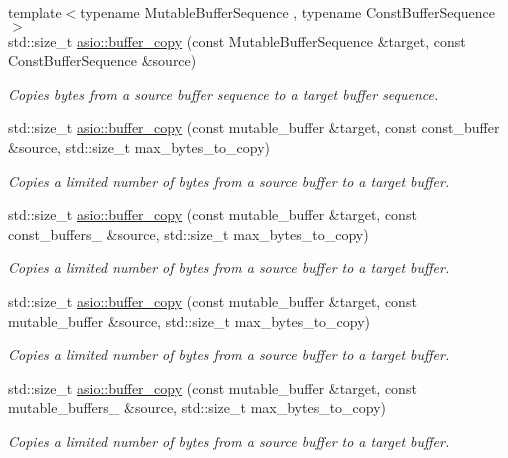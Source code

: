 \begin{DoxyCompactItemize}
{\footnotesize template$<$typename Mutable\+Buffer\+Sequence , typename Const\+Buffer\+Sequence $>$ }\\std\+::size\+\_\+t \hyperlink{group__buffer__copy_ga0ee2be3725dff58302a47a0eb2bc72bb}{asio\+::buffer\+\_\+copy} (const Mutable\+Buffer\+Sequence \&target, const Const\+Buffer\+Sequence \&source)
\begin{DoxyCompactList}\small\item\em Copies bytes from a source buffer sequence to a target buffer sequence. \end{DoxyCompactList}\item 
std\+::size\+\_\+t \hyperlink{group__buffer__copy_gaccb89801dc44bbcbf308e08dcb0c9181}{asio\+::buffer\+\_\+copy} (const mutable\+\_\+buffer \&target, const const\+\_\+buffer \&source, std\+::size\+\_\+t max\+\_\+bytes\+\_\+to\+\_\+copy)
\begin{DoxyCompactList}\small\item\em Copies a limited number of bytes from a source buffer to a target buffer. \end{DoxyCompactList}\item 
std\+::size\+\_\+t \hyperlink{group__buffer__copy_ga9e6ea40e73105d4a5a73b24320feb59d}{asio\+::buffer\+\_\+copy} (const mutable\+\_\+buffer \&target, const const\+\_\+buffers\+\_ \&source, std\+::size\+\_\+t max\+\_\+bytes\+\_\+to\+\_\+copy)
\begin{DoxyCompactList}\small\item\em Copies a limited number of bytes from a source buffer to a target buffer. \end{DoxyCompactList}\item 
std\+::size\+\_\+t \hyperlink{group__buffer__copy_ga13c7347ac0eae54aea68d4b70d144a2e}{asio\+::buffer\+\_\+copy} (const mutable\+\_\+buffer \&target, const mutable\+\_\+buffer \&source, std\+::size\+\_\+t max\+\_\+bytes\+\_\+to\+\_\+copy)
\begin{DoxyCompactList}\small\item\em Copies a limited number of bytes from a source buffer to a target buffer. \end{DoxyCompactList}\item 
std\+::size\+\_\+t \hyperlink{group__buffer__copy_ga4d1a32a028494196848be4e5347edd43}{asio\+::buffer\+\_\+copy} (const mutable\+\_\+buffer \&target, const mutable\+\_\+buffers\+\_ \&source, std\+::size\+\_\+t max\+\_\+bytes\+\_\+to\+\_\+copy)
\begin{DoxyCompactList}\small\item\em Copies a limited number of bytes from a source buffer to a target buffer. \end{DoxyCompactList}\item 

\end{DoxyCompactItemize}
